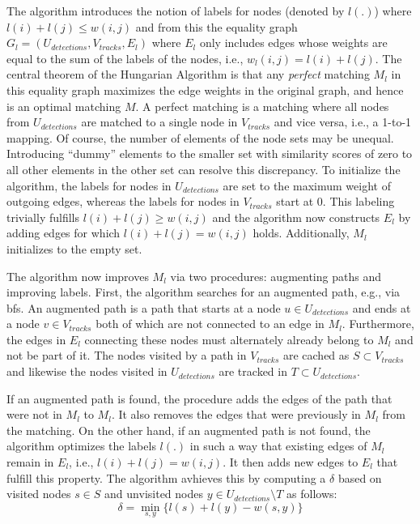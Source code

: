 \documentclass[headsepline, hidelinks, footsepline, footinclude=false, oneside, fontsize=11pt, paper=a4, listof=totoc, bibliography=totoc]{scrbook}
\begin{document}
The algorithm introduces the notion of labels for nodes (denoted by \(l(.)\)) where \(l(i) + l(j) \leq w(i, j)\) and from this the equality graph \(G_{l} = (U_{detections}, V_{tracks}, E_l)\) where \(E_l\) only includes edges whose weights 
are equal to the sum of the labels of the nodes, i.e., \(w_l(i, j) = l(i) + l(j)\).
The central theorem of the Hungarian Algorithm is that any \emph{perfect} matching \(M_l\) in this equality graph maximizes the edge weights in the original graph, and hence is an optimal matching \(M\). 
A perfect matching is a matching where all nodes from \(U_{detections}\) are matched to a single node in \(V_{tracks}\) and vice versa, i.e., a 1-to-1 mapping. 
Of course, the number of elements of the node sets may be unequal. Introducing ``dummy'' elements to the smaller set with similarity scores of zero to all other elements in the other set can resolve this discrepancy.
To initialize the algorithm, the labels for nodes in \(U_{detections}\) are set to the maximum weight of outgoing edges, whereas the labels for nodes in \(V_{tracks}\) start at 0. 
This labeling trivially fulfills \(l(i) + l(j) \geq w(i, j)\) and the algorithm now constructs \(E_l\) by adding edges for which \(l(i) + l(j) = w(i, j)\) holds.
Additionally, \(M_l\) initializes to the empty set.

The algorithm now improves \(M_l\) via two procedures: augmenting paths and improving labels.
First, the algorithm searches for an augmented path, e.g., via \gls{bfs}. 
An augmented path is a path that starts at a node \(u \in U_{detections}\) and ends at a node \(v \in V_{tracks}\) both of which are not connected to an edge in \(M_l\). 
Furthermore, the edges in \(E_l\) connecting these nodes must alternately already belong to \(M_l\) and not be part of it. The nodes visited by a path in \(V_{tracks}\) are cached as \(S \subset V_{tracks}\) and likewise
the nodes visited in \(U_{detections}\) are tracked in \(T \subset U_{detections}\).

If an augmented path is found, the procedure adds the edges of the path that were not in \(M_l\) to \(M_l\). It also removes the edges that were previously in \(M_l\) from the matching.
On the other hand, if an augmented path is not found, the algorithm optimizes the labels \(l(.)\) in such a way that existing edges of \(M_l\) remain in \(E_l\), i.e., \(l(i) + l(j) = w(i, j)\).
It then adds new edges to \(E_l\) that fulfill this property.
The algorithm avhieves this by computing a \(\delta\) based on visited nodes \(s \in S\) and unvisited nodes \(y \in U_{detections} \setminus T\) as follows:
\begin{equation}
\delta = \min_{s, y} \{l(s) + l(y) - w(s, y)\}
\end{equation}
\end{document}
